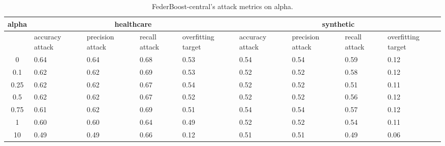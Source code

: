 \begin{table*}[]\centering
\begin{tabular}{|c| *{8}{m{1.0cm}|}}
\hline\rowcolor{gray!50}
\cellcolor{gray!80} alpha & \multicolumn{4}{c|}{healthcare} & \multicolumn{4}{c|}{synthetic}\\\hline 
& accuracy attack & precision attack & recall attack & overfitting target & accuracy attack & precision attack & recall attack & overfitting target\\\hline
0 & 0.64 & 0.64 & 0.68 & 0.53 & 0.54 & 0.54 & 0.59 & 0.12\\ \hline
0.1 & 0.62 & 0.62 & 0.69 & 0.53 & 0.52 & 0.52 & 0.58 & 0.12\\ \hline
0.25 & 0.62 & 0.62 & 0.67 & 0.54 & 0.52 & 0.52 & 0.51 & 0.11\\ \hline
0.5 & 0.62 & 0.62 & 0.67 & 0.52 & 0.52 & 0.52 & 0.56 & 0.12\\ \hline
0.75 & 0.61 & 0.62 & 0.69 & 0.51 & 0.54 & 0.54 & 0.57 & 0.12\\ \hline
1 & 0.60 & 0.60 & 0.64 & 0.49 & 0.52 & 0.52 & 0.54 & 0.11\\ \hline
10 & 0.49 & 0.49 & 0.66 & 0.12 & 0.51 & 0.51 & 0.49 & 0.06\\ \hline
\end{tabular} 
\caption{FederBoost-central's attack metrics on alpha.}
\label{tab:experiment1_alpha}
\end{table*}
